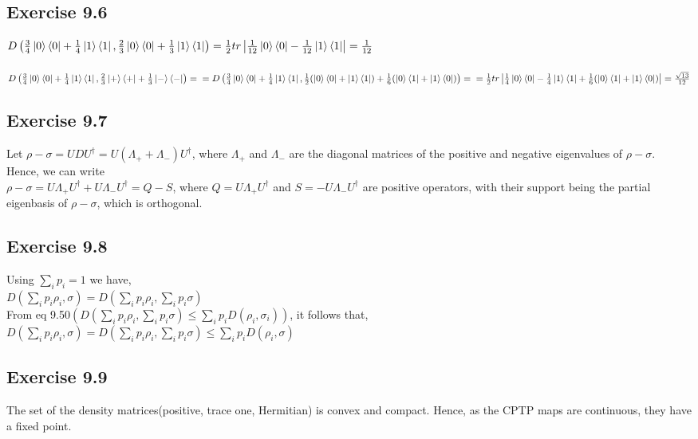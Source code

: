 \documentclass[a4paper,12pt]{article}
\begin{document}
\subsection*{Exercise 9.6}
$D\left(\frac{3}{4}\ket{0}\bra{0}+\frac{1}{4}\ket{1}\bra{1},\frac{2}{3}\ket{0}\bra{0}+\frac{1}{3}\ket{1}\bra{1}\right)=
\frac{1}{2}tr\left|\frac{1}{12}\ket{0}\bra{0}-\frac{1}{12}\ket{1}\bra{1}\right|=\frac{1}{12}$
\\
\\
$D\left(\frac{3}{4}\ket{0}\bra{0}+\frac{1}{4}\ket{1}\bra{1},\frac{2}{3}\ket{+}\bra{+}+\frac{1}{3}\ket{-}\bra{-}\right)=\\
\\
=D\left(\frac{3}{4}\ket{0}\bra{0}+\frac{1}{4}\ket{1}\bra{1},
\frac{1}{2}(\ket{0}\bra{0}+\ket{1}\bra{1})+\frac{1}{6}(\ket{0}\bra{1}+\ket{1}\bra{0})\right)=\\
\\
=\frac{1}{2}tr\left|\frac{1}{4}\ket{0}\bra{0}-\frac{1}{4}\ket{1}\bra{1}
+\frac{1}{6}(\ket{0}\bra{1}+\ket{1}\bra{0})\right|=\frac{\sqrt{13}}{12}$
\subsection*{Exercise 9.7}
Let $\rho-\sigma=UDU^\dagger=U(\Lambda_++\Lambda_-)U^\dagger$, where $\Lambda_+$ and $\Lambda_-$
are the diagonal matrices of the positive and negative eigenvalues of $\rho-\sigma$.\\
 Hence, we can write\\
$\rho-\sigma=U\Lambda_+U^\dagger+U\Lambda_-U^\dagger=Q-S$, where $Q=U\Lambda_+U^\dagger$ and
$S=-U\Lambda_-U^\dagger$ are positive operators, with their support being the partial eigenbasis
of $\rho-\sigma$, which is orthogonal.
\subsection*{Exercise 9.8}
Using $\displaystyle\sum_ip_i=1$ we have,\\
$D\left(\displaystyle\sum_ip_i\rho_i,\sigma\right)=D\left(\sum_ip_i\rho_i,\sum_ip_i\sigma\right)$\\
From eq 9.50$\left(D\left(\displaystyle\sum_ip_i\rho_i,\sum_ip_i\sigma\right)
\leq\sum_ip_iD(\rho_i,\sigma_i)\right)$, it follows that,\\
$D\left(\displaystyle\sum_ip_i\rho_i,\sigma\right)=D\left(\sum_ip_i\rho_i,\sum_ip_i\sigma\right)
\leq\sum_ip_iD(\rho_i,\sigma)$
\subsection*{Exercise 9.9}
The set of the density matrices(positive, trace one, Hermitian) is convex and compact. Hence,
as the CPTP maps are continuous, they have a fixed point. 
\end{document}
